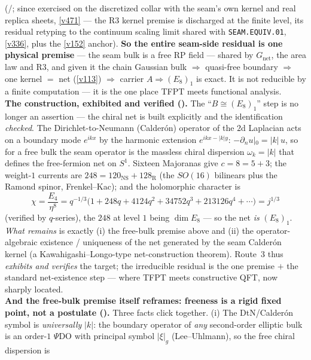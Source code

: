 \documentclass[11pt,a4paper]{article}
\begin{document}
\begin{keybox}
(/; since exercised on the discretized collar
with the seam's own kernel and real replica sheets, \vref{v471} --- the R3 kernel premise is discharged at
the finite level, its residual retyping to the continuum scaling limit shared with \texttt{SEAM.EQUIV.01},
\vref{v336}, plus the \vref{v152} anchor). \textbf{So the entire seam-side residual is one
physical premise} --- the seam bulk is a free RP field --- shared by $G_{\mathrm{net}}$, the area law and R3,
and given it the chain Gaussian bulk $\Rightarrow$ quasi-free boundary $\Rightarrow$ one kernel $=$ net
(\vref{v113}) $\Rightarrow$ carrier $A\Rightarrow(E_8)_1$ is exact. It is not reducible by a finite computation
--- it is the one place TFPT meets functional analysis.
\smallskip\\
\noindent\textbf{The construction, exhibited and verified ().} The
``$B\cong(E_8)_1$'' step is no longer an assertion --- the chiral net is built explicitly and the
identification \emph{checked}. The Dirichlet-to-Neumann (Calder\'on) operator of the $2$d Laplacian acts
on a boundary mode $e^{ikx}$ by the harmonic extension $e^{ikx-|k|y}$: $-\partial_n u|_0=|k|\,u$, so for a
free bulk the seam operator is the massless chiral dispersion $\omega_k=|k|$ that defines the free-fermion
net on $S^1$. Sixteen Majoranas give $c=8=5{+}3$; the weight-$1$ currents are
$248=120_{\mathrm{NS}}+128_{\mathrm R}$ (the $SO(16)$ bilinears plus the Ramond spinor, Frenkel--Kac); and
the holomorphic character is
\[
  \boxed{\ \chi=\frac{E_4}{\eta^8}=q^{-1/3}\bigl(1+248q+4124q^2+34752q^3+213126q^4+\cdots\bigr)=j^{1/3}\ }
\]
(verified by $q$-series), the $248$ at level $1$ being $\dim E_8$ --- so the net \emph{is} $(E_8)_1$.
\emph{What remains} is exactly (i) the free-bulk premise above and (ii) the operator-algebraic existence /
uniqueness of the net generated by the seam Calder\'on kernel (a Kawahigashi--Longo-type net-construction
theorem). Route~3 thus \emph{exhibits and verifies} the target; the irreducible residual is the one premise
$+$ the standard net-existence step --- where TFPT meets constructive QFT, now sharply located.
\smallskip\\
\noindent\textbf{And the free-bulk premise itself reframes: freeness is a rigid fixed point, not a postulate
().} Three facts click together. (i) The DtN/Calder\'on symbol is
\emph{universally} $|k|$: the boundary operator of \emph{any} second-order elliptic bulk is an order-$1$
$\Psi$DO with principal symbol $|\xi|_g$ (Lee--Uhlmann), so the free chiral dispersion is

\end{keybox}
\end{document}
